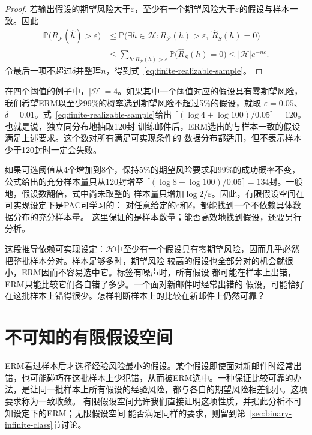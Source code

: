 \begin{proof}
若输出假设的期望风险大于$\varepsilon$，至少有一个期望风险大于$\varepsilon$的假设与样本一致。因此
\begin{align*}
 \mathbb P\bigl(R_{\mathcal P}(\hat h)>\varepsilon\bigr)
 &\leq \mathbb P\bigl(\exists h\in\mathcal H:
       R_{\mathcal P}(h)>\varepsilon,\ \hat R_S(h)=0\bigr)\\
 &\leq\sum_{h:R_{\mathcal P}(h)>\varepsilon}
       \mathbb P\bigl(\hat R_S(h)=0\bigr)
 \leq |\mathcal H|e^{-n\varepsilon}.
\end{align*}
令最后一项不超过$\delta$并整理$n$，得到式~\eqref{eq:finite-realizable-sample}。
\end{proof}

在四个阈值的例子中，$|\mathcal H|=4$。如果其中一个阈值对应的假设具有零期望风险，
我们希望ERM以至少99\%的概率选到期望风险不超过5\%的假设，就取
$\varepsilon=0.05$、$\delta=0.01$。式~\eqref{eq:finite-realizable-sample}给出
$\lceil(\log4+\log100)/0.05\rceil=120$。也就是说，独立同分布地抽取120封
训练邮件后，ERM选出的与样本一致的假设满足上述要求。这个数对所有满足可实现条件的
数据分布都适用，但不表示样本少于120封时一定会失败。

如果可选阈值从4个增加到8个，保持5\%的期望风险要求和99\%的成功概率不变，
公式给出的充分样本量只从120封增至
$\lceil(\log8+\log100)/0.05\rceil=134$封。一般地，假设数翻倍，式中尚未取整的
样本量只增加$\log2/\varepsilon$。因此，有限假设空间在可实现设定下是PAC可学习的：
对任意给定的$\varepsilon$和$\delta$，都能找到一个不依赖具体数据分布的充分样本量。
这里保证的是样本数量；能否高效地找到假设，还要另行分析。

这段推导依赖可实现设定：$\mathcal H$中至少有一个假设具有零期望风险，因而几乎必然
把整批样本分对。样本足够多时，期望风险
较高的假设也全部分对的机会就很小，ERM因而不容易选中它。标签有噪声时，所有假设
都可能在样本上出错，ERM只能比较它们各自错了多少。一个面对新邮件时经常出错的
假设，可能恰好在这批样本上错得很少。怎样判断样本上的比较在新邮件上仍然可靠？

\section{不可知的有限假设空间}
\label{sec:binary-uniform-convergence}

ERM看过样本后才选择经验风险最小的假设。某个假设即使面对新邮件时经常出错，也可能碰巧在这批样本上少犯错，从而被ERM选中。一种保证比较可靠的办法，是让同一批样本上所有假设的经验风险，都与各自的期望风险相差很小。这项要求称为一致收敛。
有限假设空间允许我们直接证明这项性质，并据此分析不可知设定下的ERM；无限假设空间
能否满足同样的要求，则留到第~\ref{sec:binary-infinite-class}节讨论。

